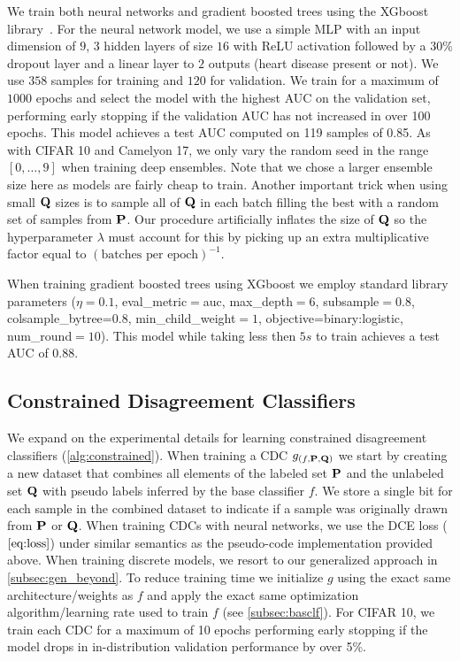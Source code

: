 \smallbreak
{}
We train both neural networks and gradient boosted trees using the XGboost library~\citep{xgb}.
For the neural network model, we use a simple MLP with an input dimension of $9$, $3$ hidden layers of size $16$ with ReLU activation followed by a $30\%$ dropout layer and a linear layer to $2$ outputs (heart disease present or not).
We use $358$ samples for training and $120$ for validation.
We train for a maximum of $1000$ epochs and select the model with the highest AUC on the validation set, performing early stopping if the validation AUC has not increased in over 100 epochs.
This model achieves a test AUC computed on 119 samples of 0.85.
As with CIFAR 10 and Camelyon 17, we only vary the random seed in the range $[0,\dots,9]$ when training deep ensembles.
Note that we chose a larger ensemble size here as models are fairly cheap to train.
Another important trick when using small $\mathbf{Q}$ sizes is to sample all of $\mathbf{Q}$ in each batch filling the best with a random set of samples from $\mathbf{P}$.
Our procedure artificially inflates the size of $\mathbf{Q}$ so the hyperparameter $\lambda$ must account for this by picking up an extra multiplicative factor equal to $(\text{batches per epoch})^{-1}$.

When training gradient boosted trees using XGboost we employ standard library parameters
($\eta=0.1$, eval\_metric$=$auc, max\_depth$=6$, subsample$=0.8$, colsample\_bytree=$0.8$, min\_child\_weight$=1$, objective=binary:logistic, num\_round$=10$).
This model while taking less then $5s$ to train achieves a test AUC of 0.88.

\subsection{Constrained Disagreement Classifiers}
\label{subsec:constr}
We expand on the experimental details for learning constrained disagreement classifiers (\autoref{alg:constrained}).
When training a CDC $g_{(f,\mathbf{P}, \mathbf{Q})}$ we start by creating a new dataset that combines all elements of the labeled set $\mathbf{P}$ and the unlabeled set $\mathbf{Q}$ with pseudo labels inferred by the base classifier $f$.
We store a single bit for each sample in the combined dataset to indicate if a sample was originally drawn from $\mathbf{P}$ or $\mathbf{Q}$.
When training CDCs with neural networks, we use the DCE loss ($\autoref{eq:loss}$)
under similar semantics as the pseudo-code implementation provided above.
When training discrete models, we resort to our generalized approach in \autoref{subsec:gen_beyond}.
To reduce training time we initialize $g$ using the exact same architecture/weights
as $f$ and apply the exact same optimization algorithm/learning rate used to train $f$ (see \autoref{subsec:basclf}).
For CIFAR 10, we train each CDC for a maximum of 10 epochs performing early stopping if the model drops in in-distribution validation performance
by over 5\%.

